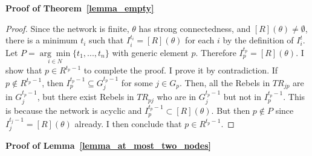 \documentclass[12pt,letter]{article}
\newtheorem*{lemma*}{Lemma}
\newtheorem{definition}{Definition}[section]
\theoremstyle{definition}
\theoremstyle{remark}
\theoremstyle{claim}
\begin{document}
%
\bigskip
\noindent\textbf{Proof of Theorem~\ref{lemma_empty}}
\begin{proof}



Since the network is finite, $\theta$ has strong connectedness, and $[R](\theta)\neq \emptyset$, there is a minimum $t_i$ such that $I^{t_i}_i=[R](\theta)$ for each $i$ by the definition of $I^t_i$. Let $P=\underset{i\in N}{\arg\min}\{t_1,...,t_n\}$ with generic element $p$. Therefore $I^{t_p}_p=[R](\theta)$. I show that $p\in R^{t_p-1}$ to complete the proof. I prove it by contradiction. If $p\notin R^{t_p-1}$, then $I^{t_p-1}_p\subseteq G^{t_p-1}_j$ for some $j\in G_p$. Then, all the Rebels in $TR_{jp}$ are in $G^{t_p-1}_j$, but there exist Rebels in $TR_{pj}$ who are in $G^{t_p-1}_j$ but not in $I^{t_p-1}_p$. This is because the network is acyclic and $I^{t_p-1}_p\subset [R](\theta)$. But then $p\notin P$ since $I^{t_j-1}_j=[R](\theta)$ already. I then conclude that $p\in R^{t_p-1}$.

\end{proof}





\noindent\textbf{Proof of Lemma~\ref{lemma_at_most_two_nodes}}
   
\end{document}

